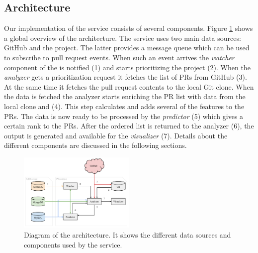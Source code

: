 \subsection{Architecture}
\label{sec:architecture}

Our implementation of the service consists of several components.
Figure \ref{fig:architecture} shows a global overview of the architecture.
The \prioritizer service uses two main data sources: GitHub and the \ghtorrent project.
The latter provides a message queue which can be used to subscribe to pull request events.
When such an event arrives the \emph{watcher} component of the \prioritizer is notified (1) and starts prioritizing the project (2).
When the \emph{analyzer} gets a prioritization request it fetches the list of PRs from GitHub (3).
At the same time it fetches the pull request contents to the local Git clone.
When the data is fetched the analyzer starts enriching the PR list with data from the local clone and \ghtorrent (4).
This step calculates and adds several of the features to the PRs.
The data is now ready to be processed by the \emph{predictor} (5) which gives a certain rank to the PRs.
After the ordered list is returned to the analyzer (6), the output is generated and available for the \emph{visualizer} (7).
Details about the different components are discussed in the following sections.

\begin{figure}
  \centering
  \includegraphics[width=0.5\textwidth]{../figs/architecture.pdf}
  \caption[Diagram of the architecture]
   {Diagram of the architecture. It shows the different data sources and components used by the \prioritizer service.}
  \label{fig:architecture}
\end{figure}

